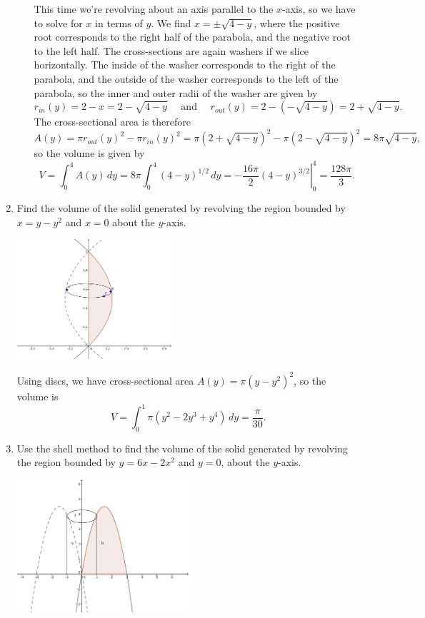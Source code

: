 \documentclass[12pt]{article}
\begin{document}
\begin{enumerate}
\begin{enumerate}
This time we're revolving about an axis parallel to the $x$-axis, so we have to solve for $x$ in terms of $y$. We find $x=\pm \sqrt{4-y}$, where the positive root corresponds to the right half of the parabola, and the negative root to the left half. The cross-sections are again washers if we slice horizontally. The inside of the washer corresponds to the right of the parabola, and the outside of the washer corresponds to the left of the parabola, so the inner and outer radii of the washer are given by
\[
 r_{in}(y) = 2-x = 2-\sqrt{4-y} \quad \text{ and } \quad r_{out}(y) = 2-(-\sqrt{4-y}) = 2+\sqrt{4-y}.
\]
The cross-sectional area is therefore
\[
 A(y) = \pi r_{out}(y)^2-\pi r_{in}(y)^2 = \pi (2+\sqrt{4-y})^2 - \pi (2-\sqrt{4-y})^2 = 8\pi\sqrt{4-y},
\]
so the volume is given by
\[
 V = \int_0^4 A(y)\,dy = 8\pi\int_0^4 (4-y)^{1/2}\,dy = \left.-\frac{16\pi}{2}(4-y)^{3/2}\right|_0^4 = \frac{128\pi}{3}.
\]


\end{enumerate}
\pagebreak

 \item Find the volume of the solid generated by revolving the region bounded by $x=y-y^2$ and $x=0$ about the $y$-axis.
 
 \medskip

\begin{multicols}{2} 
 \begin{center}
 \includegraphics[width=0.45\textwidth]{WS5-4.png}
\end{center}

Using discs, we have cross-sectional area $A(y) = \pi(y-y^2)^2$, so the volume is
\[
 V = \int_0^1 \pi(y^2-2y^3+y^4)\,dy = \frac{\pi}{30}.
\]
\end{multicols}

 \item Use the shell method to find the volume of the solid generated by revolving the region bounded by $y=6x-2x^2$ and $y=0$, about the $y$-axis.

\medskip

\begin{center}
 \includegraphics[width=0.5\textwidth]{WS5-5.png}
\end{center}


\end{enumerate}
\end{document}
